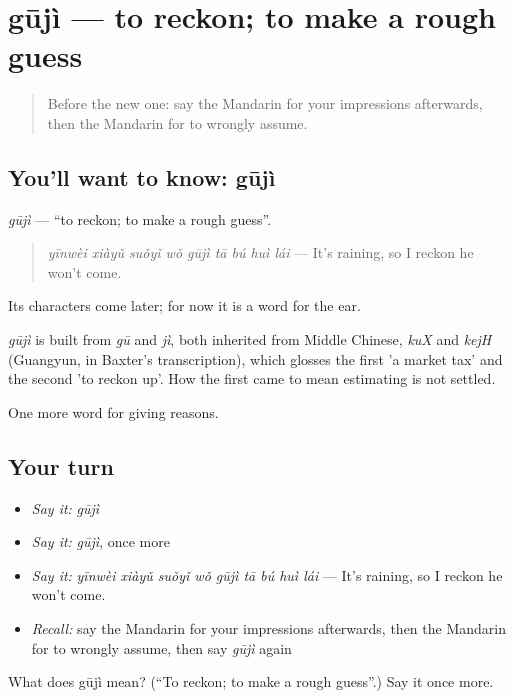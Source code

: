 \section[gūjì]{gūjì — to reckon; to make a rough guess}

\label{lesson:ZH-C346-guji}



\begin{quote}
Before the new one: say the Mandarin for your impressions afterwards, then the Mandarin for to wrongly assume.
\end{quote}

\subsection*{You'll want to know: gūjì}
\emph{gūjì} — \textquotedblleft{}to reckon; to make a rough guess\textquotedblright{}.

\begin{quote}
\emph{yīnwèi xiàyǔ suǒyǐ wǒ gūjì tā bú huì lái} — It's raining, so I reckon he won't come.
\end{quote}

Its characters come later; for now it is a word for the ear.

\begin{cousinweb}
\emph{gūjì} is built from \emph{gū} and \emph{jì}, both inherited from Middle Chinese, \emph{kuX} and \emph{kejH} (Guangyun, in Baxter's transcription), which glosses the first 'a market tax' and the second 'to reckon up'. How the first came to mean estimating is not settled.
\end{cousinweb}

\begin{grammarlens}[title={What you've built}]
One more word for giving reasons.
\end{grammarlens}

\subsection*{Your turn}
\begin{itemize}
\raggedright
  \item \emph{Say it:} \emph{gūjì}
  \item \emph{Say it:} \emph{gūjì}, once more
  \item \emph{Say it:} \emph{yīnwèi xiàyǔ suǒyǐ wǒ gūjì tā bú huì lái} — It's raining, so I reckon he won't come.
  \item \emph{Recall:} say the Mandarin for your impressions afterwards, then the Mandarin for to wrongly assume, then say \emph{gūjì} again
\end{itemize}

\begin{tcolorbox}[breakable,colback=teal!4,colframe=teal!35!black,title={Before you move on}]
What does gūjì mean? (\textquotedblleft{}To reckon; to make a rough guess\textquotedblright{}.) Say it once more.
\end{tcolorbox}

